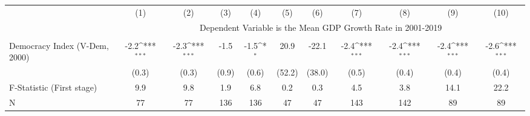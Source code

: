 {
\def\sym#1{\ifmmode^{#1}\else\(^{#1}\)\fi}
\begin{tabular}{l*{10}{c}}
\hline\hline
                    &\multicolumn{1}{c}{(1)}         &\multicolumn{1}{c}{(2)}         &\multicolumn{1}{c}{(3)}         &\multicolumn{1}{c}{(4)}         &\multicolumn{1}{c}{(5)}         &\multicolumn{1}{c}{(6)}         &\multicolumn{1}{c}{(7)}         &\multicolumn{1}{c}{(8)}         &\multicolumn{1}{c}{(9)}         &\multicolumn{1}{c}{(10)}         \\
&\multicolumn{10}{c}{ Dependent Variable is the Mean GDP Growth Rate in 2001-2019}\\\cline{2-11}\\[-1.8ex]
Democracy Index (V-Dem, 2000)&        -2.2\sym{***}&        -2.3\sym{***}&        -1.5         &        -1.5\sym{*}  &        20.9         &       -22.1         &        -2.4\sym{***}&        -2.4\sym{***}&        -2.4\sym{***}&        -2.6\sym{***}\\
                    &       (0.3)         &       (0.3)         &       (0.9)         &       (0.6)         &      (52.2)         &      (38.0)         &       (0.5)         &       (0.4)         &       (0.4)         &       (0.4)         \\
\hline
F-Statistic (First stage)&         9.9         &         9.8         &         1.9         &         6.8         &         0.2         &         0.3         &         4.5         &         3.8         &        14.1         &        22.2         \\
N                   &          77         &          77         &         136         &         136         &          47         &          47         &         143         &         142         &          89         &          89         \\
\hline\hline
\end{tabular}
}
